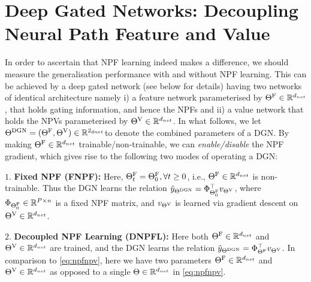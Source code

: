 \section{Deep Gated Networks: Decoupling Neural Path Feature and Value}\label{sec:decoupled}

In order to ascertain that  NPF learning indeed makes a difference, we should measure the generalisation performance with and without NPF learning. This can be achieved by a deep gated network (see  below for details) having two networks of identical architecture namely i) a feature network parameterised by ${\Theta}^{\text{F}}\in\mathbb{R}^{d_{net}}$, that holds gating information, and hence the NPFs and ii) a value network that holds the NPVs parameterised by ${\Theta}^{\text{V}}\in\mathbb{R}^{d_{net}}$.  In what follows, we let $\Theta^{\text{DGN}}=({\Theta}^{\text{F}},{\Theta}^{\text{V}})\in\mathbb{R}^{2_{dnet}}$to denote the combined parameters of a DGN. By making ${\Theta}^{\text{F}}\in\mathbb{R}^{d_{net}}$ trainable/non-trainable, we can \emph{enable/disable} the NPF gradient, which gives rise to the following two modes of operating a DGN:

$1.$ \textbf{Fixed NPF (FNPF):} Here, ${\Theta}^{\text{F}}_t={\Theta}^{\text{F}}_0,\forall t\geq 0$, i.e., ${\Theta}^{\text{F}}\in\mathbb{R}^{d_{net}}$ is non-trainable. Thus the DGN learns the relation $\hat{y}_{\Theta^{\text{DGN}}}=\Phi^\top_{{\Theta}^{\text{F}}_0}v_{{\Theta}^{\text{V}}}$, where $\Phi_{{\Theta}^{\text{F}}_0}\in \mathbb{R}^{P\times n}$ is a fixed NPF matrix, and $v_{{\Theta}^{\text{V}}}$ is learned via gradient descent on ${\Theta}^{\text{V}}\in\mathbb{R}^{d_{net}}$.

$2.$ \textbf{Decoupled NPF Learning (DNPFL):} Here both ${\Theta}^{\text{F}}\in\mathbb{R}^{d_{net}}$ and ${\Theta}^{\text{V}}\in\mathbb{R}^{d_{net}}$ are trained, and the DGN learns the relation $\hat{y}_{\Theta^{\text{DGN}}}=\Phi^\top_{{\Theta}^{\text{F}}}v_{{\Theta}^{\text{V}}}$. In comparison to \eqref{eq:npfnpv}, here we have two parameters ${\Theta}^{\text{F}}\in\mathbb{R}^{d_{net}}$ and ${\Theta}^{\text{V}}\in\mathbb{R}^{d_{net}}$ as opposed to a single $\Theta\in\mathbb{R}^{d_{net}}$ in \eqref{eq:npfnpv}.

